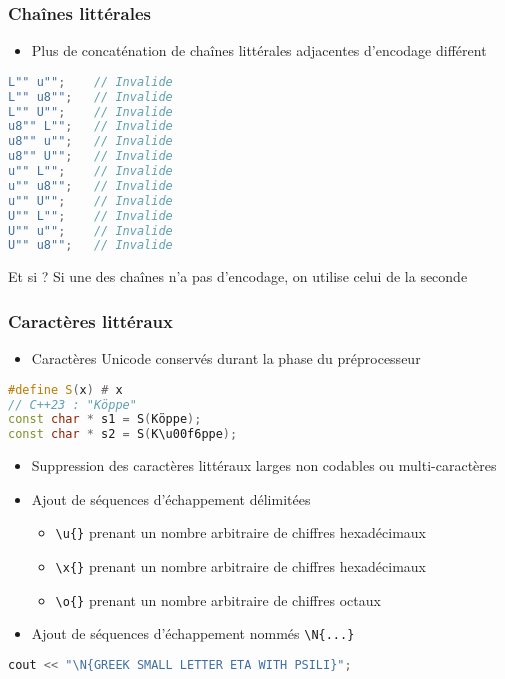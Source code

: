 \documentclass[C++.tex]{subfiles}
\begin{document}
\begin{frame}[fragile]
	\frametitle{Chaînes littérales}
	\begin{itemize}
		\item Plus de concaténation de chaînes littérales adjacentes d'encodage différent
	\end{itemize}

	\begin{lstlisting}[language=C++]
L"" u"";	// Invalide
L"" u8"";	// Invalide
L"" U"";	// Invalide
u8"" L"";	// Invalide
u8"" u"";	// Invalide
u8"" U"";	// Invalide
u"" L"";	// Invalide
u"" u8"";	// Invalide
u"" U"";	// Invalide
U"" L"";	// Invalide
U"" u"";	// Invalide
U"" u8"";	// Invalide\end{lstlisting}

	\begin{block}{Et si  ?}
		Si une des chaînes n'a pas d'encodage, on utilise celui de la seconde
	\end{block}
\end{frame}

\begin{frame}[fragile]
	\frametitle{Caractères littéraux}
	\begin{itemize}
		\item Caractères Unicode conservés durant la phase du préprocesseur
	\end{itemize}

	\begin{lstlisting}[language=C++]
#define S(x) # x
// C++23 : "Köppe"
const char * s1 = S(Köppe);
const char * s2 = S(K\u00f6ppe);\end{lstlisting}


	\begin{itemize}
		\item Suppression des caractères littéraux larges non codables ou multi-caractères
		\item Ajout de séquences d'échappement délimitées


		\begin{itemize}
			\item \lstinline|\u{}| prenant un nombre arbitraire de chiffres hexadécimaux
			\item \lstinline|\x{}| prenant un nombre arbitraire de chiffres hexadécimaux
			\item \lstinline|\o{}| prenant un nombre arbitraire de chiffres octaux
		\end{itemize}
		\item Ajout de séquences d'échappement nommés \lstinline|\N{...}|
	\end{itemize}

	\begin{lstlisting}[language=C++]
cout << "\N{GREEK SMALL LETTER ETA WITH PSILI}";\end{lstlisting}
\end{frame}
\end{document}
